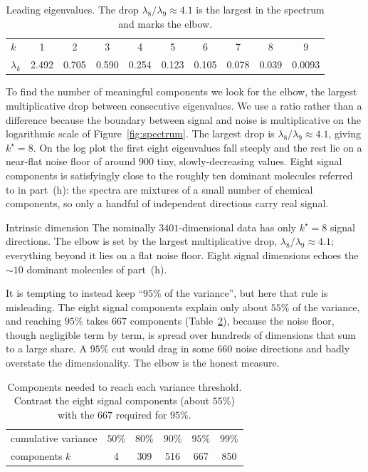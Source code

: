 \documentclass[12pt,a4paper]{article}
\theoremstyle{definition}
\begin{document}
\begin{table}[htbp]\centering\small
\begin{tabular}{lccccccccc}
\toprule
$k$ & 1 & 2 & 3 & 4 & 5 & 6 & 7 & 8 & 9\\
$\lambda_k$ & 2.492 & 0.705 & 0.590 & 0.254 & 0.123 & 0.105 & 0.078 & 0.039 & 0.0093\\
\bottomrule
\end{tabular}
\caption{Leading eigenvalues. The drop $\lambda_8/\lambda_9\approx4.1$ is the largest in the
spectrum and marks the elbow.}\label{tab:eig}
\end{table}

To find the number of meaningful components we look for the elbow, the largest multiplicative drop
between consecutive eigenvalues. We use a ratio rather than a difference because the boundary
between signal and noise is multiplicative on the logarithmic scale of Figure~\ref{fig:spectrum}.
The largest drop is $\lambda_8/\lambda_9\approx4.1$, giving $k^\star=8$. On the log plot the first
eight eigenvalues fall steeply and the rest lie on a near-flat noise floor of around $900$ tiny,
slowly-decreasing values. Eight signal components is satisfyingly close to the roughly ten dominant
molecules referred to in part~(h): the spectra are mixtures of a small number of chemical
components, so only a handful of independent directions carry real signal.

\begin{callout}{Intrinsic dimension}
The nominally $3401$-dimensional data has only $k^\star=8$ signal directions. The elbow is set by
the largest multiplicative drop, $\lambda_8/\lambda_9\approx4.1$; everything beyond it lies on a
flat noise floor. Eight signal dimensions echoes the $\sim10$ dominant molecules of part~(h).
\end{callout}

It is tempting to instead keep ``$95\%$ of the variance'', but here that rule is misleading. The
eight signal components explain only about $55\%$ of the variance, and reaching $95\%$ takes $667$
components (Table~\ref{tab:cum}), because the noise floor, though negligible term by term, is
spread over hundreds of dimensions that sum to a large share. A $95\%$ cut would drag in some $660$
noise directions and badly overstate the dimensionality. The elbow is the honest measure.

\begin{table}[htbp]\centering\small
\begin{tabular}{lccccc}
\toprule
cumulative variance & $50\%$ & $80\%$ & $90\%$ & $95\%$ & $99\%$\\
components $k$ & 4 & 309 & 516 & 667 & 850\\
\bottomrule
\end{tabular}
\caption{Components needed to reach each variance threshold. Contrast the eight signal components
(about $55\%$) with the $667$ required for $95\%$.}\label{tab:cum}
\end{table}
\end{document}

